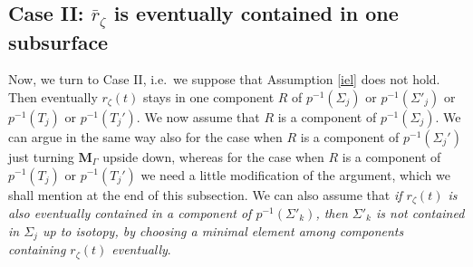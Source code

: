 \documentclass{amsart}
\newtheorem{lemma}[theorem]{Lemma}
\theoremstyle{definition}
\newcommand{\hyperbolic}{\mathbb{H}}
\begin{document}
%
%




%
%
%
%
%
%
%
%




\subsection{Case II: $\bar r_\zeta$ is eventually contained in one subsurface}
Now, we turn to Case II, i.e.\ we suppose that Assumption \ref{iel} does not hold.
Then eventually $r_\zeta(t)$ stays in one component $R$ of $p^{-1}(\Sigma_j)$ or $p^{-1}(\Sigma'_j)$ or $p^{-1}(T_j)$ or $p^{-1}(T_j')$.
We now assume that $R$ is a component of $p^{-1}(\Sigma_j)$.
We can argue in the same way also for the case when $R$ is a component of $p^{-1}(\Sigma_j')$ just turning $\mathbf M_\Gamma$ upside down, whereas for the case when $R$ is a component of $p^{-1}(T_j)$ or $p^{-1}(T_j')$ we need a little modification of the argument, which we shall mention at the end of this subsection.
We can also assume that {\em if $r_\zeta(t)$ is also eventually contained in a component of $p^{-1}(\Sigma'_k)$, then $\Sigma'_k$ is {\em not} contained in $\Sigma_j$ up to isotopy, by choosing a minimal element among components containing $r_\zeta(t)$ eventually}.
\end{document}
